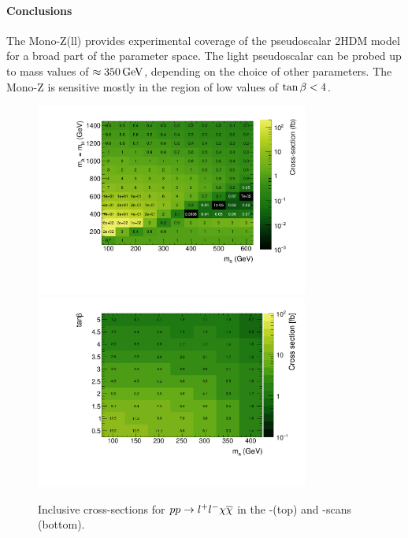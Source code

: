 \paragraph{Conclusions} The Mono-Z(ll) provides experimental coverage of the pseudoscalar 2HDM model for a broad part of the parameter space. The light pseudoscalar \a can be probed up to mass values of $\approx\unit[350]{GeV}$, depending on the choice of other parameters. The Mono-Z is sensitive mostly in the region of low values of $\tan\beta<4$.

\begin{figure}
\centering
\includegraphics[width=0.8\textwidth]{texinputs/04_grid/figures/monoz/leptonic/xs_2d_inclusive_26300.pdf}
\includegraphics[width=0.8\textwidth]{texinputs/04_grid/figures/monoz/leptonic/tanbma_xsec_ll.pdf}
\caption{Inclusive cross-sections for $pp\rightarrow l^{+}l^{-}\chi\overline{\chi}$ in the \ma-\mA (top) and \ma-\tanb scans (bottom).}
\label{fig:monoz_ll_xs_inclusive}
\end{figure}


